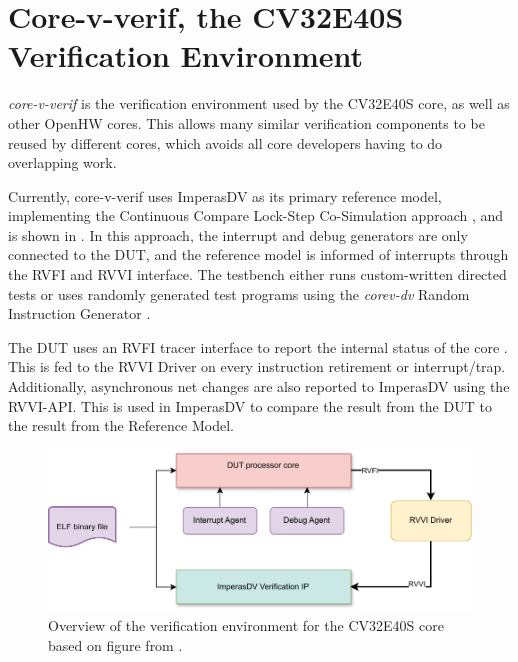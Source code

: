 \section{Core-v-verif, the CV32E40S Verification Environment}
\label{sec:bg_core-v-verif}

\textit{core-v-verif} \cite{openhwgroupOpenhwgroupCorevverif2023} is the verification environment used by the CV32E40S core, as well as other OpenHW cores. This allows many similar verification components to be reused by different cores, which avoids all core developers having to do overlapping work.

Currently, core-v-verif uses ImperasDV as its primary reference model, implementing the Continuous Compare Lock-Step Co-Simulation approach \cite{duncangrahamRISCVVerificationImplications2023}, and is shown in . In this approach, the interrupt and debug generators are only connected to the DUT, and the reference model is informed of interrupts through the RVFI and RVVI interface. 
The testbench either runs custom-written directed tests or uses randomly generated test programs using the \textit{corev-dv} Random Instruction Generator
\cite{openhwgroupOpenhwgroupCorevverif2023}.

The DUT uses an RVFI tracer interface to report the internal status of the core \cite{symbioticedaRiscvformalDocsRvfi2020}. This is fed to the RVVI Driver on every instruction retirement or interrupt/trap. Additionally, asynchronous net changes are also reported to ImperasDV using the RVVI-API. This is used in ImperasDV to compare the result from the DUT to the result from the Reference Model. 


\begin{figure}
    \centering
    \includegraphics[width=0.75\linewidth]{figures/core-v-verif.pdf}
    \caption{Overview of the verification environment for the CV32E40S core based on figure from \cite{openhwgroupOpenhwgroupCorevverif2023}.}
    \label{fig:cv32e40s-overview}
\end{figure}



